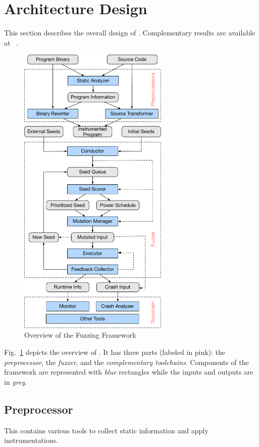\section{Architecture Design}\label{sec:details}

This section describes the overall design of {\FOT}. Complementary results {\FOT} are available at ~\cite{fot-webpage}.


\begin{figure}[t]
	\centering
	\includegraphics[width=0.64\textwidth]{res/fot/FOT_overview}
	\caption{Overview of the {\FOT} Fuzzing Framework}
	\label{fig:fot_workflow}
\end{figure}

Fig.~\ref{fig:fot_workflow} depicts the overview of {\FOT}.
It has three parts (labeled in pink): the \emph{preprocessor}, the \emph{fuzzer}, and the \emph{complementary toolchains}.
Components of the framework are represented with \emph{blue} rectangles while the inputs and outputs are in \emph{grey}.


\subsection{Preprocessor}
This contains various tools to collect static information and apply instrumentations.



